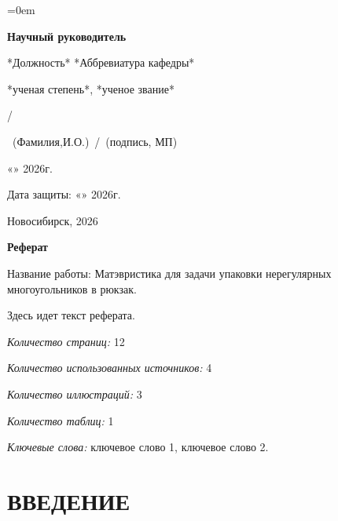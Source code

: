 \documentclass[a4paper]{article}
\begin{document}
	\begin{minipage}{80mm}\parindent=0em
		\begin{flushleft}
			\small{\textbf{Научный руководитель}\par
				\medskip
				*Должность* *Аббревиатура кафедры*\par
				\medskip
				*ученая степень*, *ученое звание*\par
				\medskip		
				\small{\;}%
				/ \makebox[2cm]{\dotfill}\par}
			\scriptsize{~(Фамилия,И.О.)~/~(подпись, МП)}\par
			\smallskip
			\small{«\makebox[1cm]{\dotfill}»\makebox[3cm]{\dotfill} 2026г.}
		\end{flushleft}
	\end{minipage}
	\vspace{1cm}
	\begin{flushright}
		\small Дата защиты: \small{«\makebox[1cm]{\dotfill}»\makebox[3cm]{\dotfill} 2026г.}
	\end{flushright}
    \vspace{1cm}
		\begin{center}
			\small{Новосибирск, 2026}
		\end{center} 

	\newpage
	\thispagestyle{empty} %
	\begin{center}
		\large{\textbf {Реферат}}
	\end{center} 	

    Название работы: Матэвристика для задачи упаковки нерегулярных многоугольников в рюкзак.
    
    Здесь идет текст реферата.  
    
    \textit{Количество страниц:} 12
    
    \textit{Количество использованных источников:} 4
    
    \textit{Количество иллюстраций:} 3
    
    \textit{Количество таблиц:} 1
    
    \textit{Ключевые слова:} ключевое слово 1, ключевое слово 2.
	
	\newpage
	
	\tableofcontents
	\normalsize
	
	\newpage
	\section*{ВВЕДЕНИЕ}
\end{document}
